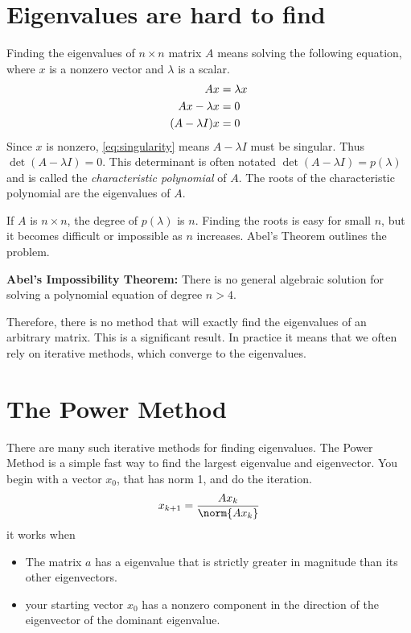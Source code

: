 \label{lab:EigSolve}

\section*{Eigenvalues are hard to find}

Finding the eigenvalues of $n \times n$ matrix $A$ means solving the following equation, where $x$ is a nonzero vector and $\lambda$ is a scalar.
\begin{align}
A x &= \lambda x \notag \\
A x - \lambda x &= 0 \notag \\
(A - \lambda I)x  &= 0 \label{eq:singularity}
\end{align}
Since $x$ is nonzero, \eqref{eq:singularity} means $A-\lambda I$ must be singular.
Thus $\det(A - \lambda I) = 0$.  This determinant is often notated $\det(A - \lambda I) = p(\lambda)$ and is called the \emph{characteristic polynomial} of $A$.
The roots of the characteristic polynomial are the eigenvalues of $A$.

If $A$ is $n \times n$, the degree of $p(\lambda)$ is  $n$.
Finding the roots is easy for small $n$, but it becomes difficult or impossible as $n$ increases.
Abel's Theorem  outlines the problem.

\begin{theorem}
{\bf Abel's Impossibility Theorem:} There is no general algebraic solution for solving a polynomial equation of degree $n>4$.
\label{Theorem:Abel}
\end{theorem}

Therefore, there is no method that will exactly find the eigenvalues of an arbitrary matrix.
This is a significant result. In practice it means that we often rely on iterative methods, which converge to the eigenvalues.

\section*{The Power Method}
There are many such iterative methods for finding eigenvalues. The Power Method is a simple fast way to find the largest eigenvalue and eigenvector. You begin with a vector $x_0$, that has norm 1, and do the iteration.
\[
x_{k+1}=\frac{Ax_k}{\norm{Ax_k}}
\]
it works when
\begin{itemize}
\item The matrix $a$ has a eigenvalue that is strictly greater in magnitude than its other eigenvectors.
\item your starting vector $x_0$ has a nonzero component in the direction of the eigenvector of the dominant eigenvalue.

\end{itemize}

